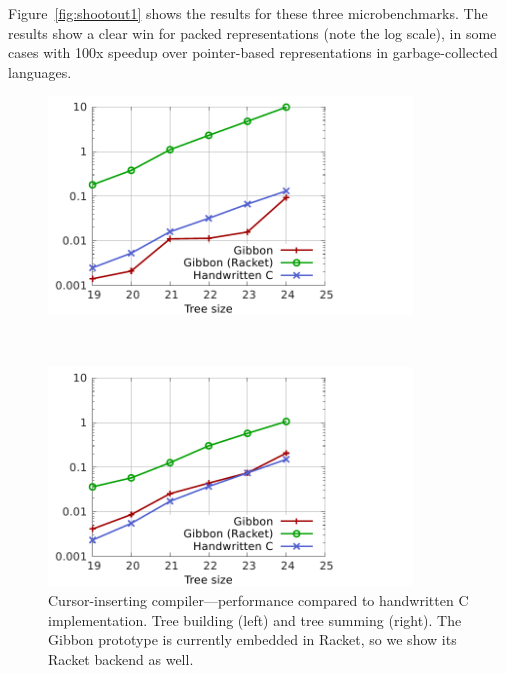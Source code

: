 \documentclass[a4paper,english]{lipics-v2016}
\begin{document}
Figure~\ref{fig:shootout1} shows the results for these three microbenchmarks. The results show a clear win for packed representations (note the log scale), in some cases
with 100x speedup over pointer-based representations in
garbage-collected languages. 

\begin{figure}[t]
  \vspace{-2mm}
\begin{minipage}{1.04\textwidth}
  \begin{minipage}{.49\textwidth}
    \centering
    \includegraphics[width=3.8in]{./figs/shootout_gibbon_buildtree.pdf}
  \end{minipage}
  $ $ 
  \begin{minipage}{.49\textwidth}
    \centering
    \includegraphics[width=3.8in]{./figs/shootout_gibbon_sumtree.pdf}
  \end{minipage}
\end{minipage}
   \vspace{-4mm}
   \caption{Cursor-inserting compiler---performance compared to handwritten C
     implementation.  Tree building (left) and tree summing (right). The Gibbon
     prototype is currently embedded in Racket, so we show its Racket backend as
   well.}
   \label{fig:shootout2}
   \vspace{-4mm}
\end{figure}
\end{document}
